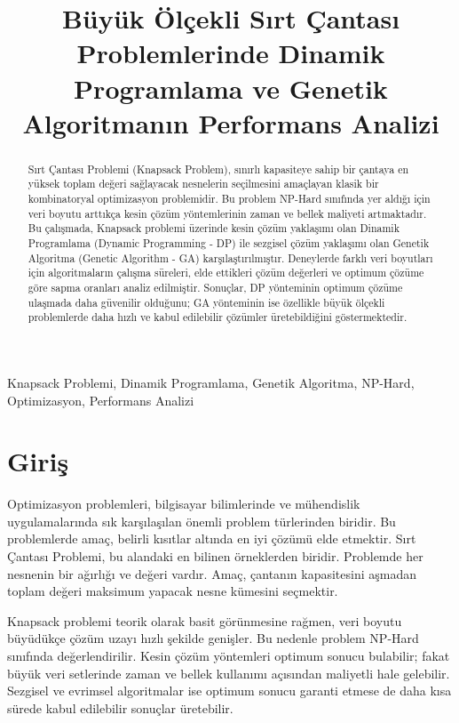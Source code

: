 \documentclass[conference]{IEEEtran}
\title{Büyük Ölçekli Sırt Çantası Problemlerinde Dinamik Programlama ve Genetik Algoritmanın Performans Analizi}
\author{
\IEEEauthorblockN{Halil Oğuz Çetin\IEEEauthorrefmark{1}, Edasu Kaya\IEEEauthorrefmark{2}}
\IEEEauthorblockA{
Manisa Celal Bayar Üniversitesi, Yazılım Mühendisliği Bölümü\\
\IEEEauthorrefmark{1}232803054 \quad
\IEEEauthorrefmark{2}232803046\\
\textbf{GitHub:} \href{https://github.com/HalilOguzCetin/knapsack-algorithm-analysis}{github.com/HalilOguzCetin/knapsack-algorithm-analysis}
}
}
\begin{document}
\maketitle

\begin{abstract}
Sırt Çantası Problemi (Knapsack Problem), sınırlı kapasiteye sahip bir çantaya en yüksek toplam değeri sağlayacak nesnelerin seçilmesini amaçlayan klasik bir kombinatoryal optimizasyon problemidir. Bu problem NP-Hard sınıfında yer aldığı için veri boyutu arttıkça kesin çözüm yöntemlerinin zaman ve bellek maliyeti artmaktadır. Bu çalışmada, Knapsack problemi üzerinde kesin çözüm yaklaşımı olan Dinamik Programlama (Dynamic Programming - DP) ile sezgisel çözüm yaklaşımı olan Genetik Algoritma (Genetic Algorithm - GA) karşılaştırılmıştır. Deneylerde farklı veri boyutları için algoritmaların çalışma süreleri, elde ettikleri çözüm değerleri ve optimum çözüme göre sapma oranları analiz edilmiştir. Sonuçlar, DP yönteminin optimum çözüme ulaşmada daha güvenilir olduğunu; GA yönteminin ise özellikle büyük ölçekli problemlerde daha hızlı ve kabul edilebilir çözümler üretebildiğini göstermektedir.
\end{abstract}

\begin{IEEEkeywords}
Knapsack Problemi, Dinamik Programlama, Genetik Algoritma, NP-Hard, Optimizasyon, Performans Analizi
\end{IEEEkeywords}

\section{Giriş}
Optimizasyon problemleri, bilgisayar bilimlerinde ve mühendislik uygulamalarında sık karşılaşılan önemli problem türlerinden biridir. Bu problemlerde amaç, belirli kısıtlar altında en iyi çözümü elde etmektir. Sırt Çantası Problemi, bu alandaki en bilinen örneklerden biridir. Problemde her nesnenin bir ağırlığı ve değeri vardır. Amaç, çantanın kapasitesini aşmadan toplam değeri maksimum yapacak nesne kümesini seçmektir.

Knapsack problemi teorik olarak basit görünmesine rağmen, veri boyutu büyüdükçe çözüm uzayı hızlı şekilde genişler. Bu nedenle problem NP-Hard sınıfında değerlendirilir. Kesin çözüm yöntemleri optimum sonucu bulabilir; fakat büyük veri setlerinde zaman ve bellek kullanımı açısından maliyetli hale gelebilir. Sezgisel ve evrimsel algoritmalar ise optimum sonucu garanti etmese de daha kısa sürede kabul edilebilir sonuçlar üretebilir.
\end{document}

